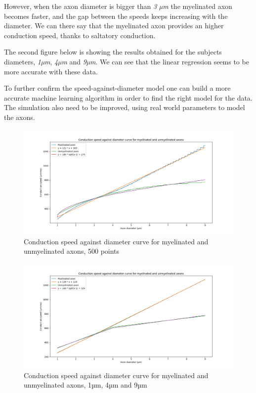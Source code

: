 \documentclass[]{article}
\begin{document}
However, when the axon diameter is bigger than \emph{3 µm} the
myelinated axon becomes faster, and the gap between the speeds keeps
increasing with the diameter. We can there say that the myelinated axon
provides an higher conduction speed, thanks to saltatory conduction.

The second figure below is showing the results obtained for the subjects
diameters, \emph{1µm}, \emph{4µm} and \emph{9µm}. We can see that the
linear regression seems to be more accurate with these data.

To further confirm the speed-against-diameter model one can build a more
accurate machine learning algorithm in order to find the right model for
the data. The simulation also need to be improved, using real world
parameters to model the axons.

\begin{figure}
\centering
\includegraphics{speed_against_diameter.png}
\caption{Conduction speed against diameter curve for myelinated and
unmyelinated axons, 500 points}
\end{figure}

\begin{figure}
\centering
\includegraphics{speed_against_diameter_1_4_9.png}
\caption{Conduction speed against diameter curve for myelinated and
unmyelinated axons, 1µm, 4µm and 9µm}
\end{figure}
\end{document}
